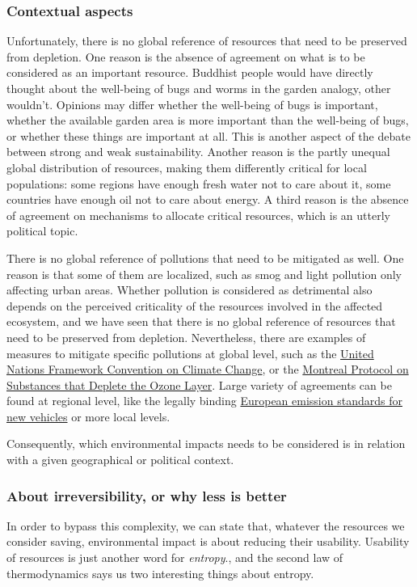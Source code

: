 \documentclass{article}
\begin{document}
\subsubsection{Contextual aspects}
\label{sec:context}
Unfortunately, there is no global reference of resources that need to be preserved from depletion. One reason is the absence of agreement on what is to be considered as an important resource. Buddhist people would have directly thought about the well-being of bugs and worms in the garden analogy, other wouldn't. Opinions may differ whether the well-being of bugs is important, whether the available garden area is more important than the well-being of bugs, or whether these things are important at all. This is another aspect of the debate between strong and weak sustainability. Another reason is the partly unequal global distribution of resources, making them differently critical for local populations: some regions have enough fresh water not to care about it, some countries have enough oil not to care about energy. A third reason is the absence of agreement on mechanisms to allocate critical resources, which is an utterly political topic. 

There is no global reference of pollutions that need to be mitigated as well. One reason is that some of them are localized, such as smog and light pollution only affecting urban areas. Whether pollution is considered as detrimental also depends on the perceived criticality of the resources involved in the affected ecosystem, and we have seen that there is no global reference of resources that need to be preserved from depletion. Nevertheless, there are examples of measures to mitigate specific pollutions at global level, such as the \href{https://en.wikipedia.org/wiki/United_Nations_Framework_Convention_on_Climate_Change}{United Nations Framework Convention on Climate Change}, or the \href{https://en.wikipedia.org/wiki/Montreal_Protocol}{Montreal Protocol on Substances that Deplete the Ozone Layer}. Large variety of agreements can be found at regional level, like the legally binding \href{https://en.wikipedia.org/wiki/European_emission_standards}{European emission standards for new vehicles} or more local levels. 

Consequently, which environmental impacts needs to be considered is in relation with a given geographical or political context.

\subsubsection{About irreversibility, or why less is better}
\label{sec:irreversibility}
In order to bypass this complexity, we can state that, whatever the resources we consider saving, environmental impact is about reducing their usability. Usability of resources is just another word for \emph{entropy}., and the second law of thermodynamics says us two interesting things about entropy.
\end{document}
